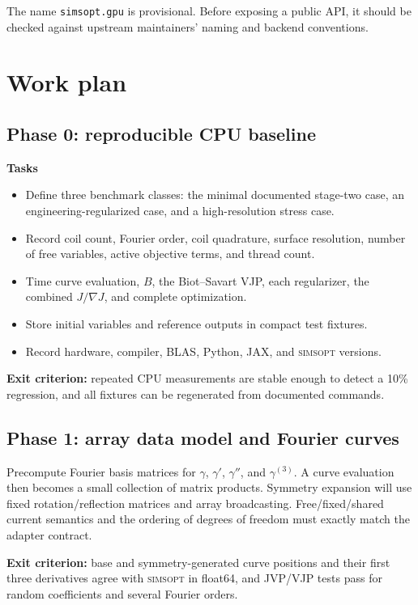 \documentclass[11pt,a4paper]{article}
\newcommand{\simsopt}{\textsc{simsopt}}
\newcommand{\code}[1]{\texttt{#1}}
\begin{document}
The name \code{simsopt.gpu} is provisional.  Before exposing a public API, it
should be checked against upstream maintainers' naming and backend conventions.

\section{Work plan}

\subsection{Phase 0: reproducible CPU baseline}

\textbf{Tasks}
\begin{itemize}
  \item Define three benchmark classes: the minimal documented stage-two case,
        an engineering-regularized case, and a high-resolution stress case.
  \item Record coil count, Fourier order, coil quadrature, surface resolution,
        number of free variables, active objective terms, and thread count.
  \item Time curve evaluation, $B$, the Biot--Savart VJP, each regularizer, the
        combined $J/\nabla J$, and complete optimization.
  \item Store initial variables and reference outputs in compact test fixtures.
  \item Record hardware, compiler, BLAS, Python, JAX, and \simsopt{} versions.
\end{itemize}

\textbf{Exit criterion:} repeated CPU measurements are stable enough to detect
a 10\% regression, and all fixtures can be regenerated from documented
commands.

\subsection{Phase 1: array data model and Fourier curves}

Precompute Fourier basis matrices for $\gamma$, $\gamma'$, $\gamma''$, and
$\gamma^{(3)}$.  A curve evaluation then becomes a small collection of matrix
products.  Symmetry expansion will use fixed rotation/reflection matrices and
array broadcasting.  Free/fixed/shared current semantics and the ordering of
degrees of freedom must exactly match the adapter contract.

\textbf{Exit criterion:} base and symmetry-generated curve positions and their
first three derivatives agree with \simsopt{} in float64, and JVP/VJP tests pass
for random coefficients and several Fourier orders.
\end{document}
